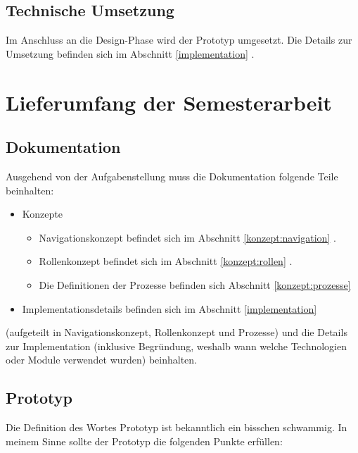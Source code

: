 \subsection{Technische Umsetzung}
Im Anschluss an die Design-Phase wird der Prototyp umgesetzt. Die Details zur Umsetzung befinden sich im Abschnitt \ref{implementation} .


\section{Lieferumfang der Semesterarbeit}
\subsection{Dokumentation}

Ausgehend von der Aufgabenstellung muss die Dokumentation folgende Teile beinhalten:
\begin{itemize}
	\item Konzepte
	\begin{itemize}
		\item Navigationskonzept befindet sich im Abschnitt \ref{konzept:navigation} .
		\item Rollenkonzept befindet sich im Abschnitt \ref{konzept:rollen} .
		\item Die Definitionen der Prozesse befinden sich Abschnitt \ref{konzept:prozesse} 
	\end{itemize}
	\item Implementationsdetails befinden sich im Abschnitt \ref{implementation} 
\end{itemize}
(aufgeteilt in Navigationskonzept, Rollenkonzept und Prozesse) und die Details zur Implementation (inklusive Begr\"undung, weshalb wann welche Technologien oder Module verwendet wurden) beinhalten. 

\subsection{Prototyp}
Die Definition des Wortes Prototyp ist bekanntlich ein bisschen schwammig. In meinem Sinne sollte der Prototyp die folgenden Punkte erf\"ullen:

